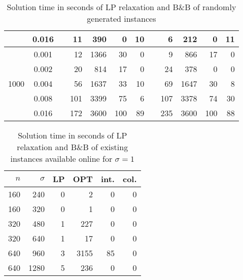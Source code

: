 \begin{table}[]
\begin{tabular}{ccrrrrrrrrrr}
 & 0.016 & &11   &390 & 0 &10 & & 6  &212 & 0   &11  \\
\hline                         
\multirow{5}{*}{1000}                               
 & 0.001 & & 12  &1366& 30& 0 & & 9  &866   & 17 & 0 \\
 & 0.002 & & 20  & 814& 17& 0 & & 24 &378   & 0  & 0 \\
 & 0.004 & & 56  &1637& 33&10 & & 69 &1647  & 30 & 8 \\
 & 0.008 & &101  &3399& 75& 6 & & 107&3378  & 74 &30 \\
 & 0.016 & &172  &3600&100&89 & & 235&3600  &100 &88 
\end{tabular}
\caption{Solution time in seconds of LP relaxation and B\&B of randomly generated instances}
\label{tab:soltime}
\end{table}
			 

\begin{table}[]
	\centering
\begin{tabular}{rrrrrr}
$n$ & $\sigma$ & LP  & OPT &  int. & col.\\
\hline
 160 & 240  & 0    &  2   &   0   &   0  \\
 160 & 320  & 0    &  1   &   0   &   0  \\
 320 & 480  & 1    &227   &   0   &   0  \\
 320 & 640  & 1    & 17   &   0   &   0  \\
 640 & 960  & 3    &3155  &  85   &   0  \\
 640 &1280  & 5    &236   &   0   &   0  
\end{tabular}
\caption{Solution time in seconds of LP relaxation and B\&B of existing instances available online for $\sigma=1$}
\label{tab:soltime-exist}
\end{table}

